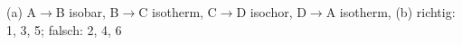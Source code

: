 (a) A$\to$B isobar, B$\to$C isotherm, C$\to$D isochor, D$\to$A isotherm, (b) richtig: 1, 3, 5; falsch: 2, 4, 6
